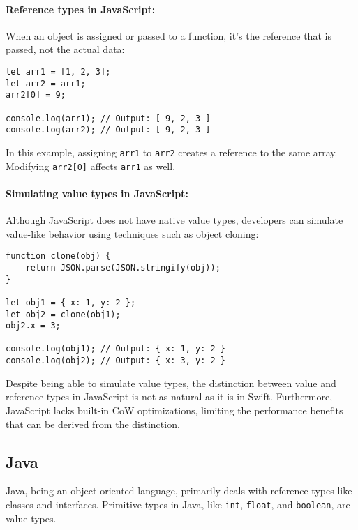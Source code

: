 \paragraph{Reference types in JavaScript:}
When an object is assigned or passed to a function, it's the reference that is passed, not the actual data:

\begin{verbatim}
let arr1 = [1, 2, 3];
let arr2 = arr1;
arr2[0] = 9;

console.log(arr1); // Output: [ 9, 2, 3 ]
console.log(arr2); // Output: [ 9, 2, 3 ]
\end{verbatim}

In this example, assigning \texttt{arr1} to \texttt{arr2} creates a reference to the same array. Modifying \texttt{arr2[0]} affects \texttt{arr1} as well.

\paragraph{Simulating value types in JavaScript:}
Although JavaScript does not have native value types, developers can simulate value-like behavior using techniques such as object cloning:

\begin{verbatim}
function clone(obj) {
    return JSON.parse(JSON.stringify(obj));
}

let obj1 = { x: 1, y: 2 };
let obj2 = clone(obj1);
obj2.x = 3;

console.log(obj1); // Output: { x: 1, y: 2 }
console.log(obj2); // Output: { x: 3, y: 2 }
\end{verbatim}

Despite being able to simulate value types, the distinction between value and reference types in JavaScript is not as natural as it is in Swift. Furthermore, JavaScript lacks built-in CoW optimizations, limiting the performance benefits that can be derived from the distinction.

\subsection{Java}

Java, being an object-oriented language, primarily deals with reference types like classes and interfaces. Primitive types in Java, like \texttt{int}, \texttt{float}, and \texttt{boolean}, are value types.

